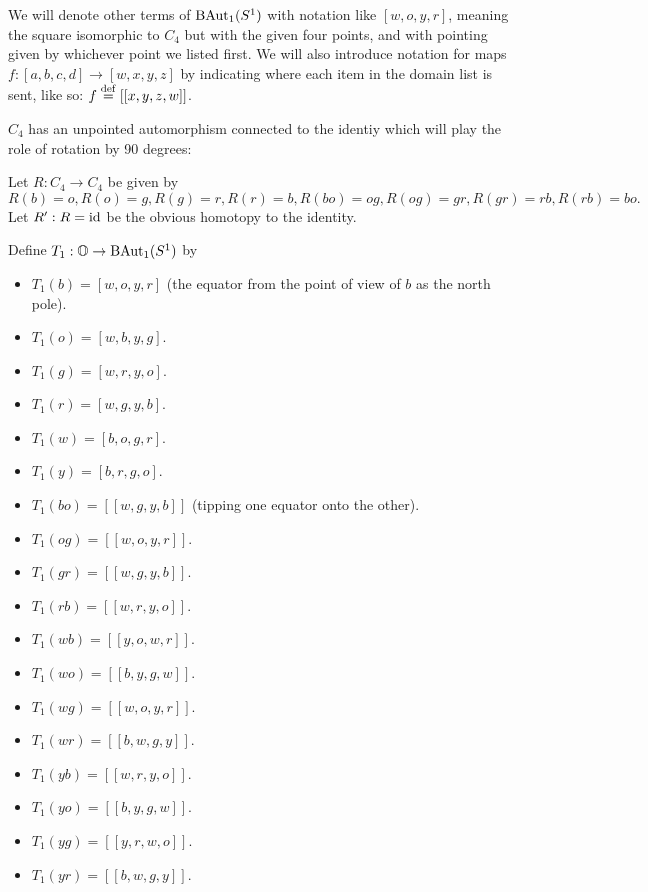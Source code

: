 \documentclass[12pt]{article}
\begin{document}
We will denote other terms of \( \mathrm{BAut}_1(S^1) \) with notation like \( [w, o, y, r] \), meaning the square isomorphic to \( C_4 \) but with the given four points, and with pointing given by whichever point we listed first. We will also introduce notation for maps \( f:[a, b, c, d]\to [w, x, y, z] \) by indicating where each item in the domain list is sent, like so: \( f\stackrel{\mathrm{def}}{=}[[x, y, z, w]] \).

\( C_4 \) has an unpointed automorphism connected to the identiy which will play the role of rotation by 90 degrees:

\begin{mydef}
Let \( R:C_4\to C_4 \) be given by \( R(b)=o, R(o)=g, R(g)=r, R(r)=b, R(bo)=og, R(og)=gr, R(gr)=rb, R(rb)=bo. \) Let \( R':R=\text{id} \) be the obvious homotopy to the identity.
\end{mydef}

\begin{mydef}
Define \( T_1:\mathbb{O}\to\mathrm{BAut}_1(S^1) \) by 
\begin{itemize}
\item \( T_1(b)=[w, o, y, r] \) (the equator from the point of view of \( b \) as the north pole).
\item \( T_1(o)=[w, b, y, g] \).
\item \( T_1(g)=[w, r, y, o] \).
\item \( T_1(r)=[w, g, y, b] \).
\item \( T_1(w)=[b, o, g, r] \).
\item \( T_1(y)=[b, r, g, o] \).
\item \( T_1(bo)=[[w, g, y, b]] \) (tipping one equator onto the other).
\item \( T_1(og)=[[w, o, y, r]] \).
\item \( T_1(gr)=[[w, g, y, b]] \).
\item \( T_1(rb)=[[w, r, y, o]] \).
\item \( T_1(wb)=[[y, o, w, r]] \).
\item \( T_1(wo)=[[b, y, g, w]] \).
\item \( T_1(wg)=[[w, o, y, r]] \).
\item \( T_1(wr)=[[b, w, g, y]] \).
\item \( T_1(yb)=[[w, r, y, o]] \).
\item \( T_1(yo)=[[b, y, g, w]] \).
\item \( T_1(yg)=[[y, r, w, o]] \).
\item \( T_1(yr)=[[b, w, g, y]] \).
\end{itemize}
\end{mydef}
\end{document}
